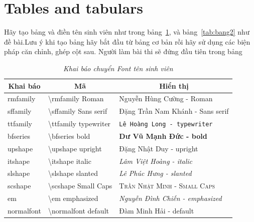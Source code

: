 \documentclass[a4paper,12pt]{article}
\begin{document}
\section{Tables and tabulars}
Hãy tạo bảng và điền tên sinh viên như trong bảng~\ref{tab:bang1}, và bảng~\ref{tab:bang2} như đề bài.Lưu ý khi tạo bảng hãy bắt đầu từ bảng cơ bản rồi hãy sử dụng các biện pháp căn chỉnh, ghép cột sau. Người làm bài thi sẽ đứng đầu tiên trong bảng
\begin{table}[tbh]
    \centering
    \caption{\textit{Khai báo chuyển Font tên sinh viên}}
    \vspace{5mm}
    \begin{tabular}{|l|l|l|}
        \hline
        \multicolumn{1}{|c}{\textbf{Khai báo}} & \multicolumn{1}{c}{\textbf{Mã}} & \multicolumn{1}{c|}{\textbf{Hiển thị}} \\
        \hline
        rmfamily & \textbackslash rmfamily Roman & Nguyễn Hùng Cường - Roman \\
        \hline
        sffamily & \textbackslash sffamily Sans serif & \textsf{Đặng Trần Nam Khánh - Sans serif}\\
        \hline
        ttfamily & \textbackslash ttfamily typewriter & \texttt{Lê Hoàng Long - typewriter} \\
        \hline \hline
        bfseries & \textbackslash bfseries bold & \textbf{Dư Vũ Mạnh Đức - bold}\\
        \hline \hline
        upshape & \textbackslash upshape upright & \textup{Đặng Nhật Duy - upright}\\
        \hline
        itshape & \textbackslash itshape italic & \textit{Lâm Việt Hoàng - italic}\\
        \hline
        slshape & \textbackslash slshape slanted & \textsl{Lê Phúc Hưng - slanted}\\
        \hline
        scshape & \textbackslash scshape Small Caps & \textsc{Trần Nhật Minh - Small Caps}\\ 
        \hline
        em & \textbackslash em emphasized & \emph{Nguyễn Đình Chiến - emphasized}\\
        \hline
        \hline
        normalfont & \textbackslash normalfont default & \textnormal{Đàm Minh Hải - default}\\
        \hline
    \end{tabular}
    \label{tab:bang1}
\end{table}
\newpage
\end{document}
